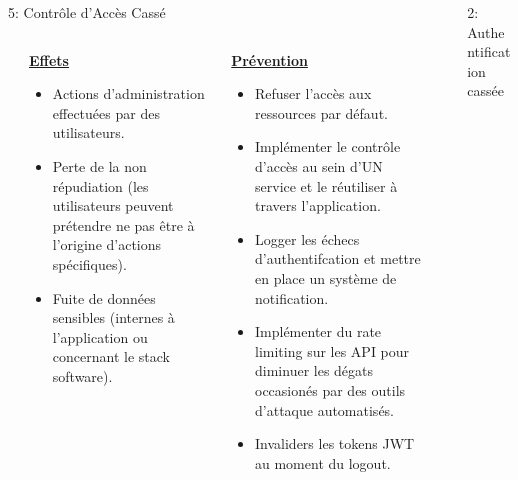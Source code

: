 \documentclass[final,hyperref={pdfpagelabels=false}]{beamer}
\begin{document}
\begin{frame}[t]
\begin{columns}[t]
\begin{column}{.465\textwidth}
\begin{block}{5: Contrôle d'Accès Cassé}
	\begin{columns}[T]
		\begin{column}{.01\textwidth}
		\end{column}
		\begin{column}{0.495\textwidth}
			\vfill
			\uline{\textbf{Effets}}
			\begin{itemize}
				\item Actions d'administration effectuées par des utilisateurs.
				\item Perte de la non répudiation (les utilisateurs peuvent prétendre ne pas être à l'origine d'actions spécifiques).
				\item Fuite de données sensibles (internes à l'application ou concernant le stack software).
			\end{itemize}
			\vfill
		\end{column}
		\begin{column}{0.495\textwidth}
			\vfill
			\uline{\textbf{Prévention}}
			\begin{itemize}
				\item Refuser l'accès aux ressources par défaut.
				\item Implémenter le contrôle d'accès au sein d'UN service et le réutiliser à travers l'application.
				\item Logger les échecs d'authentifcation et mettre en place un système de notification.
				\item Implémenter du rate limiting sur les API pour diminuer les dégats occasionés par des outils d'attaque automatisés.
				\item Invaliders les tokens JWT au moment du logout.
			\end{itemize}
		\end{column}
	\end{columns}
\end{block}

\end{column} %

\begin{column}{.03\textwidth}\end{column} %
 
\begin{column}{.465\textwidth} %
            
	\begin{block}{2: Authentification cassée}

		\begin{columns}[T]


\end{columns}
\end{block}
\end{column}
\end{columns}
\end{frame}
\end{document}
